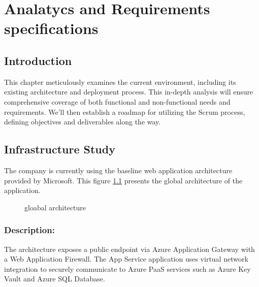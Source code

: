 \chapter{Analatycs and Requirements specifications}

\section*{Introduction}
This chapter meticulously examines the current environment, including its existing architecture and deployment process. This in-depth analysis will ensure comprehensive coverage of both functional and non-functional needs and requirements. We'll then establish a roadmap for utilizing the Scrum process, defining objectives and deliverables along the way.

\section{Infrastructure Study}
The company is currently using the baseline web application architecture provided by Microsoft\cite{webArticle6}.
This figure \ref{fig:gloabal_architecture} presents the global architecture of the application.

\begin{figure}[htpb]
    \centering
    \caption{gloabal architecture}
    \label{fig:gloabal_architecture}
\end{figure}

\pagebreak

\subsection{Description:} The architecture exposes a public endpoint via Azure Application Gateway with a Web Application Firewall. The App Service application uses virtual network integration to securely communicate to Azure PaaS services such as Azure Key Vault and Azure SQL Database.

